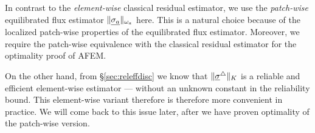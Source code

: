 \documentclass[thesis.tex]{subfiles}
\begin{document}
\begin{rem}
  In contrast to the \emph{element-wise} classical residual estimator, we use the \emph{patch-wise} equilibrated flux estimator $\| \underline{\sigma_a} \|_{\omega_a}$ here. This
  is a natural choice because of the localized patch-wise properties of the equilibrated flux estimator. 
  Moreover, we require the patch-wise equivalence with the classical residual estimator for the optimality proof of AFEM.

  On the other hand, from \S\ref{sec:releffdisc} we know that $\| \underline{\sigma}^\triangle \|_K$ is a reliable and efficient
  element-wise estimator --- without an unknown constant in the reliability bound. This element-wise variant
  therefore is therefore more convenient in practice. We will come back to this issue later, after we have proven
  optimality of the patch-wise version.
\end{rem}
\end{document}

